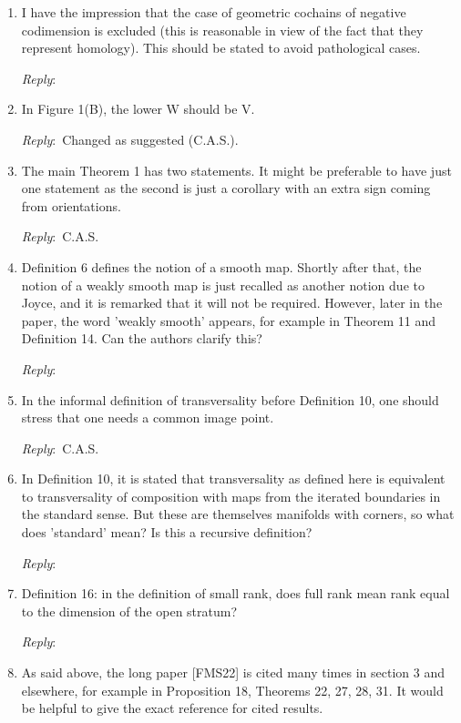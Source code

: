 \documentclass{amsart}
\newcommand{\ar}{\medskip\noindent\textit{Reply}:\ }
\newcommand{\tbw}{\ar \hrulefill}
\newcommand{\cas}{\ar C.A.S.}
\begin{document}
	\begin{enumerate}
		\item I have the impression that the case of geometric cochains of negative codimension is excluded (this is reasonable in view of the fact that they represent homology). This should be stated to avoid pathological cases.

		\tbw

		\item In Figure 1(B), the lower W should be V.

		\ar Changed as suggested (C.A.S.).

		\item The main Theorem 1 has two statements. It might be preferable to have just one statement as the second is just a corollary with an extra sign coming from orientations.

		\cas

		\item Definition 6 defines the notion of a smooth map. Shortly after that, the notion of a weakly smooth map is just recalled as another notion due to Joyce, and it is remarked that it will not be required. However, later in the paper, the word 'weakly smooth' appears, for example in Theorem 11 and Definition 14. Can the authors clarify this?

		\tbw

		\item In the informal definition of transversality before Definition 10, one should stress that one needs a common image point.

		\cas

		\item In Definition 10, it is stated that transversality as defined here is equivalent to transversality of composition with maps from the iterated boundaries in the standard sense. But these are themselves manifolds with corners, so what does 'standard' mean? Is this a recursive definition?

		\tbw

		\item Definition 16: in the definition of small rank, does full rank mean rank equal to the dimension of the open stratum?

		\tbw

		\item As said above, the long paper [FMS22] is cited many times in section 3 and elsewhere, for example in Proposition 18, Theorems 22, 27, 28, 31. It would be helpful to give the exact reference for cited results.


\end{enumerate}
\end{document}
